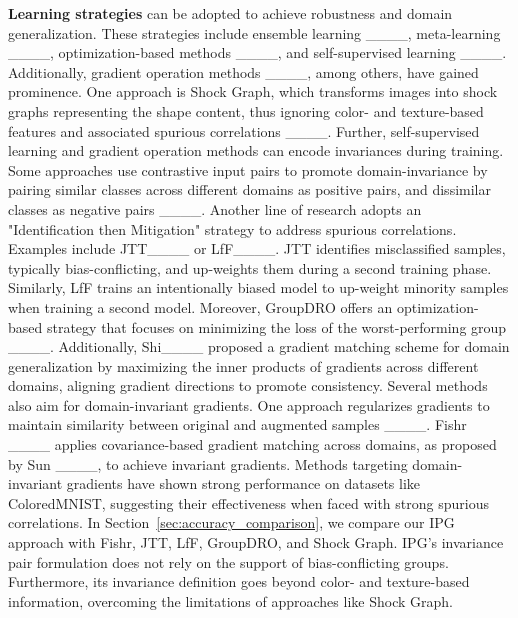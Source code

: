 \textbf{Learning strategies} can be adopted to achieve robustness and domain generalization. 
These strategies include ensemble learning ____, meta-learning ____, optimization-based methods ____, and self-supervised learning ____.
Additionally, gradient operation methods ____, among others, have gained prominence. 
One approach is Shock Graph, which transforms images into shock graphs representing the shape content, thus ignoring color- and texture-based features and associated spurious correlations ____.
%
Further, self-supervised learning and gradient operation methods can encode invariances during training. 
Some approaches use contrastive input pairs to promote domain-invariance by pairing similar classes across different domains as positive pairs, and dissimilar classes as negative pairs ____.
Another line of research adopts an "Identification then Mitigation" strategy to address spurious correlations.
Examples include JTT____ or LfF____.
JTT identifies misclassified samples, typically bias-conflicting, and up-weights them during a second training phase.
Similarly, LfF trains an intentionally biased model to up-weight minority samples when training a second model.
Moreover, GroupDRO offers an optimization-based strategy that focuses on minimizing the loss of the worst-performing group ____.
Additionally, Shi____ proposed a gradient matching scheme for domain generalization by maximizing the inner products of gradients across different domains, aligning gradient directions to promote consistency.
%
Several methods also aim for domain-invariant gradients.
One approach regularizes gradients to maintain similarity between original and augmented samples ____. 
Fishr ____ applies covariance-based gradient matching across domains, as proposed by Sun ____, to achieve invariant gradients.
Methods targeting domain-invariant gradients have shown strong performance on datasets like ColoredMNIST, suggesting their effectiveness when faced with strong spurious correlations. 
In Section~\ref{sec:accuracy_comparison}, we compare our IPG approach with Fishr, JTT, LfF, GroupDRO, and Shock Graph.
IPG's invariance pair formulation does not rely on the support of bias-conflicting groups. 
Furthermore, its invariance definition goes beyond color- and texture-based information, overcoming the limitations of approaches like Shock Graph.